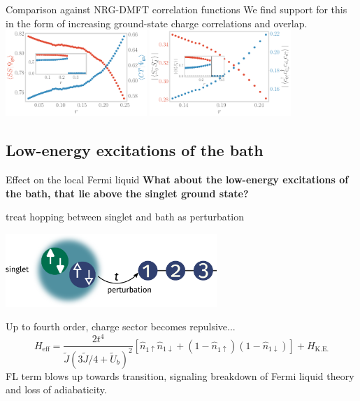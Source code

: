 \documentclass[9pt,aspectratio=169]{beamer}
\begin{document}
\begin{frame}{Comparison against NRG-DMFT correlation functions}
{We find support for this in the form of \alert{increasing ground-state charge correlations and overlap}.\\[5pt]
\includegraphics[width=0.4\textwidth]{corrs_gs.pdf}
\hspace*{\fill}
\includegraphics[width=0.4\textwidth]{pairing.pdf}
}
\end{frame}

\begin{frame}{}
\section{Low-energy excitations of the bath}
\end{frame}

\begin{frame}{Effect on the local Fermi liquid}
	\textbf{What about the \alert{low-energy excitations} of the bath, that lie above the singlet ground state?}
\begin{itemize}
\nitem treat hopping between singlet and bath as perturbation 
\begin{center}
\includegraphics[width=0.6\textwidth]{perturbation.pdf}
\end{center}
\nitem Up to fourth order, charge sector becomes repulsive...
\[H_\text{eff} = \frac{2t^4}{\tilde J\left(3\tilde J/4 + \tilde U_b \right)^2}\left[\hat n_{1 \uparrow}\hat n_{1 \downarrow} + \left(1 - \hat n_{1 \uparrow}\right)\left(1 - \hat n_{1 \downarrow}\right)\right]  + H_\text{K.E.}\]
\nitem FL term blows up towards transition, signaling \alert{breakdown} of Fermi liquid theory and loss of adiabaticity.
\end{itemize}
\end{frame}
\end{document}
